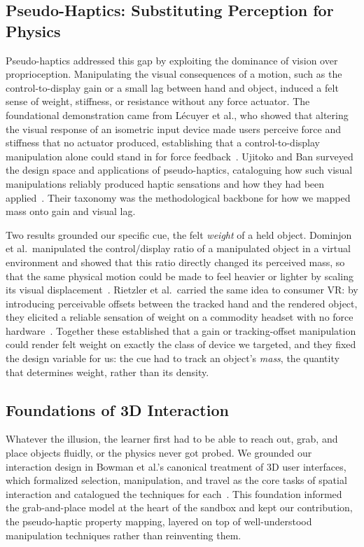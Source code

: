 \subsection{Pseudo-Haptics: Substituting Perception for Physics}
Pseudo-haptics addressed this gap by exploiting the dominance of vision over
proprioception. Manipulating the visual consequences of a motion, such as the
control-to-display gain or a small lag between hand and object, induced a felt
sense of weight, stiffness, or resistance without any force actuator. The
foundational demonstration came from L{\'e}cuyer et al., who showed that altering
the visual response of an isometric input device made users perceive force and
stiffness that no actuator produced, establishing that a control-to-display
manipulation alone could stand in for force feedback~\cite{lecuyer2000pseudo}.
Ujitoko and Ban surveyed the design space and applications of pseudo-haptics,
cataloguing how such visual manipulations reliably produced haptic sensations and
how they had been applied~\cite{ujitoko2021pseudo}. Their taxonomy was the
methodological backbone for how we mapped mass onto gain and visual lag.

Two results grounded our specific cue, the felt \emph{weight} of a held object.
Dominjon et al.\ manipulated the control/display ratio of a manipulated object in a
virtual environment and showed that this ratio directly changed its perceived mass,
so that the same physical motion could be made to feel heavier or lighter by scaling
its visual displacement~\cite{dominjon2005influence}. Rietzler et al.\ carried the
same idea to consumer VR: by introducing perceivable offsets between the tracked
hand and the rendered object, they elicited a reliable sensation of weight on a
commodity headset with no force hardware~\cite{rietzler2018breaking}. Together these
established that a gain or tracking-offset manipulation could render felt weight on
exactly the class of device we targeted, and they fixed the design variable for us:
the cue had to track an object's \emph{mass}, the quantity that determines weight,
rather than its density.

\subsection{Foundations of 3D Interaction}
Whatever the illusion, the learner first had to be able to reach out, grab, and
place objects fluidly, or the physics never got probed. We grounded our interaction
design in Bowman et al.'s canonical treatment of 3D user interfaces, which formalized
selection, manipulation, and travel as the core tasks of spatial interaction and
catalogued the techniques for each~\cite{bowman2004}. This foundation informed the
grab-and-place model at the heart of the sandbox and kept our contribution, the
pseudo-haptic property mapping, layered on top of well-understood manipulation
techniques rather than reinventing them.

